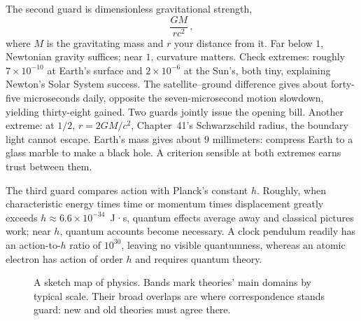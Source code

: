 The second guard is dimensionless gravitational strength,
\[
\frac{GM}{rc^{2}}\, ,
\]
where $M$ is the gravitating mass and $r$ your distance from it. Far below $1$, Newtonian gravity suffices; near $1$, curvature matters. Check extremes: roughly $7\times10^{-10}$ at Earth's surface and $2\times10^{-6}$ at the Sun's, both tiny, explaining Newton's Solar System success. The satellite--ground difference gives about forty-five microseconds daily, opposite the seven-microsecond motion slowdown, yielding thirty-eight gained. Two guards jointly issue the opening bill. Another extreme: at $1/2$, $r=2GM/c^{2}$, Chapter~41's Schwarzschild radius, the boundary light cannot escape. Earth's mass gives about $9$ millimeters: compress Earth to a glass marble to make a black hole. A criterion sensible at both extremes earns trust between them.

The third guard compares action with Planck's constant $h$. Roughly, when characteristic energy times time or momentum times displacement greatly exceeds $h\approx6.6\times10^{-34}$~J·s, quantum effects average away and classical pictures work; near $h$, quantum accounts become necessary. A clock pendulum readily has an action-to-$h$ ratio of $10^{30}$, leaving no visible quantumness, whereas an atomic electron has action of order $h$ and requires quantum theory.

\begin{figure}[htbp]
\centering
{}
\caption{A sketch map of physics. Bands mark theories' main domains by typical scale. Their broad overlaps are where correspondence stands guard: new and old theories must agree there.}
\end{figure}

